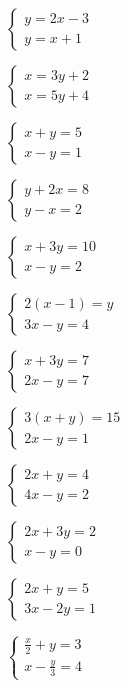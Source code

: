 \documentclass[12pt,a4paper]{article}
\begin{document}
\begin{enumerate}[label=\alph*), itemsep=1cm]
    \begin{minipage}[t]{0.45\textwidth}
    \item $\begin{cases} y = 2x - 3 \\ y = x + 1 \end{cases}$
    \item $\begin{cases} x = 3y + 2 \\ x = 5y + 4 \end{cases}$
    \item $\begin{cases} x + y = 5 \\ x - y = 1 \end{cases}$
    \item $\begin{cases} y + 2x = 8 \\ y - x = 2 \end{cases}$
    \item $\begin{cases} x + 3y = 10 \\ x - y = 2 \end{cases}$
    \item $\begin{cases} 2(x - 1) = y \\ 3x - y = 4 \end{cases}$
    \end{minipage}
    \begin{minipage}[t]{0.45\textwidth}
    \item $\begin{cases} x + 3y = 7 \\ 2x - y = 7 \end{cases}$
    \item $\begin{cases} 3(x + y) = 15 \\ 2x - y = 1 \end{cases}$
    \item $\begin{cases} 2x + y = 4 \\ 4x - y = 2 \end{cases}$
    \item $\begin{cases} 2x + 3y = 2 \\ x - y = 0 \end{cases}$
    \item $\begin{cases} 2x + y = 5 \\ 3x - 2y = 1 \end{cases}$
    \item $\begin{cases} \frac{x}{2} + y = 3 \\ x - \frac{y}{3} = 4 \end{cases}$
    \end{minipage}
\end{enumerate}
\end{document}
